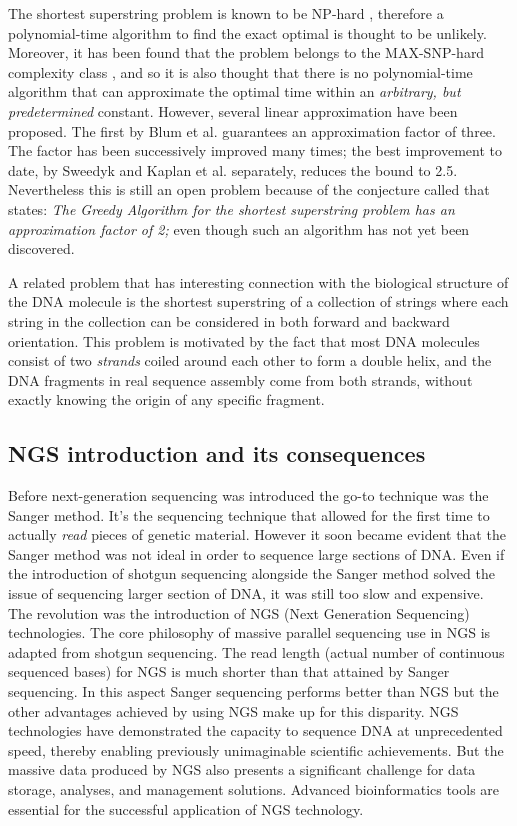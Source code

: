 \documentclass[a4paper,12pt, oneside]{article}
\begin{document}
\par
The shortest superstring problem is known to be NP-hard \cite{computersintract}, therefore a polynomial-time algorithm to find the exact optimal is thought to be unlikely. Moreover, it has been found that the problem belongs to the MAX-SNP-hard complexity class \cite{linearssp}, and so it is also thought that there is no polynomial-time algorithm that can approximate the optimal time within an \textit{arbitrary, but predetermined} constant. However, several linear approximation have been proposed. The first by Blum et al. \cite{linearssp} guarantees an approximation factor of three. The factor has been successively improved many times; the best improvement to date, by Sweedyk\cite{scs25apprx} and Kaplan et al. separately\cite{scs25apprx2}, reduces the bound to 2.5. Nevertheless this is still an open problem because of the conjecture called  that states: \textit{The Greedy Algorithm for the shortest superstring problem has an approximation factor of 2;} even though such an algorithm has not yet been discovered.
\par
A related problem that has interesting connection with the biological structure of the DNA molecule is the shortest superstring of a collection of strings where each string in the collection can be considered in both forward and backward orientation. This problem is motivated by the fact that most DNA molecules consist of two \textit{strands} coiled around each other to form a double helix, and the DNA fragments in real sequence assembly come from both strands, without exactly knowing the origin of any specific fragment.

\subsection{NGS introduction and its consequences}

Before next-generation sequencing was introduced the go-to technique was the Sanger method. It's the  sequencing technique that allowed for the first time to actually \textit{read} pieces of genetic material. However it soon became evident that the Sanger method was not ideal in order to sequence large sections of DNA. Even if the introduction of shotgun sequencing alongside the Sanger method solved the issue of sequencing larger section of DNA, it was still too slow and expensive. The revolution was the introduction of NGS (Next Generation Sequencing) technologies. The core philosophy of massive parallel sequencing use in NGS is adapted from shotgun sequencing. The read length (actual number of continuous sequenced bases) for NGS is much shorter than that attained by Sanger sequencing.\cite{impactofngs} In this aspect Sanger sequencing performs better than NGS but the other advantages achieved by using NGS make up for this disparity. NGS technologies have demonstrated the capacity to sequence DNA at unprecedented speed, thereby enabling previously unimaginable scientific achievements. But the massive data produced by NGS also presents a significant challenge for data storage, analyses, and management solutions. Advanced bioinformatics tools are essential for the successful application of NGS technology. \cite{impactofngs}
\end{document}
